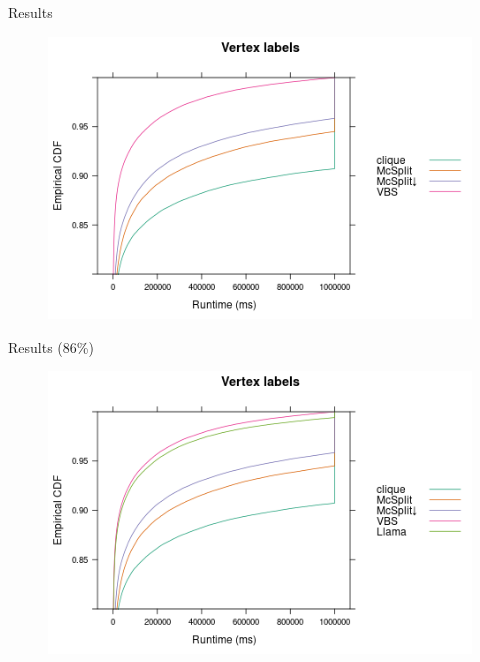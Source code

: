 \documentclass{beamer}
\begin{document}
\begin{frame}{Results}
  \begin{figure}
    \centering
    \includegraphics[width=\textwidth]{../dissertation/images/ecdf_vertex_labels.png}
  \end{figure}
\end{frame}

\begin{frame}{Results (86\%)}
  \begin{figure}
    \centering
    \includegraphics[width=\textwidth]{../dissertation/images/ecdf_vertex_labels_llama.png}
  \end{figure}
\end{frame}
\end{document}
